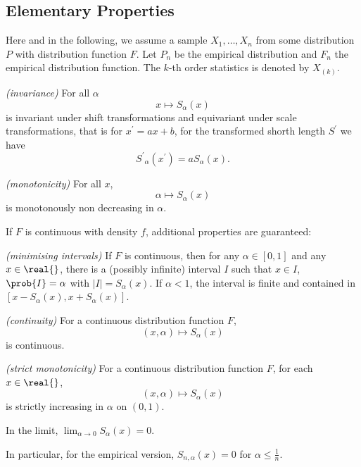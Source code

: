 \documentclass[dvips,12pt,a4paper,twoside]{amsart}
\begin{document}
\subsection{Elementary Properties}
Here and in the following, we assume a sample $X_1, \ldots, X_n$ from some distribution $P$ with 
distribution function $F$. Let $P_n$ be the empirical distribution and $F_n$ the empirical distribution 
function. The $k$-th order statistics is denoted by $X_{(k)}$.

\begin{rem}\emph{(invariance)}
For all $\alpha$
$$
x \mapsto S_\alpha(x)
$$
is invariant under shift transformations and equivariant under scale transformations, that is for $x^\prime 
= a  x+b$, for the transformed shorth length $S^\prime$ we have
$$
{S^\prime}_{\alpha}(x^\prime) = a  S_\alpha(x).
$$
\end{rem}
%
\begin{rem}\emph{(monotonicity)}\label{rem:monot}
For all $x$, 
$$
\alpha \mapsto S_\alpha(x)
$$
is monotonously non decreasing in $\alpha$.
\end{rem}
%
%

If $F$ is continuous with  density $f$, additional properties are guaranteed:

\begin{rem}\emph{(minimising intervals)}
If $F$ is continuous, then for any $\alpha \in [0, 1]$ and any $x \in \real{}$, there is a (possibly infinite) 
interval $I$ such that $x \in I$, $\prob{I} = \alpha$ with $|I| = S_{\alpha}(x)$. \newline
If $\alpha < 1$, the interval is
finite and contained in $[x-S_{\alpha}(x), x+ S_{\alpha}(x)]$.
\end{rem}

\begin{rem}\emph{(continuity)}
For a continuous distribution function $F$,
$$
(x,\alpha) \mapsto S_\alpha(x)
$$
is continuous.
\end{rem}
%
\begin{rem}\emph{(strict monotonicity)}\label{rem:monotone}
For a continuous distribution function $F$, for each $x \in \real{}$,
$$
(x,\alpha) \mapsto S_\alpha(x)
$$
is strictly increasing in $\alpha$ on $(0, 1)$.
\end{rem}


In the limit,  $\lim_{\alpha \rightarrow 0} S_\alpha(x) =0$. 

In particular, for the empirical version, $S_{n, 
\alpha}(x) =0$ for $\alpha \leq \frac{1}{n}$.
\end{document}
